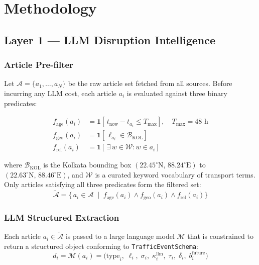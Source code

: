 \chapter{Methodology}

\section{Layer 1 --- LLM Disruption Intelligence}

\subsection{Article Pre-filter}

Let $\mathcal{A} = \{a_1, \dots, a_N\}$ be the raw article set fetched
from all sources. Before incurring any LLM cost, each article $a_i$ is
evaluated against three binary predicates:

\begin{align}
  f_{\text{age}}(a_i)  &= \mathbf{1}\!\left[\,t_{\text{now}} - t_{a_i} \leq T_{\max}\right],
  \quad T_{\max} = 48\text{ h} \label{eq:filter_age}\\
  f_{\text{geo}}(a_i)  &= \mathbf{1}\!\left[\,\ell_{a_i} \in \mathcal{B}_{\text{KOL}}\right]
  \label{eq:filter_geo}\\
  f_{\text{rel}}(a_i)  &= \mathbf{1}\!\left[\,\exists\, w \in \mathcal{W} : w \in a_i\right]
  \label{eq:filter_rel}
\end{align}

where $\mathcal{B}_{\text{KOL}}$ is the Kolkata bounding box
$(22.45^\circ\text{N},\,88.24^\circ\text{E})$ to
$(22.63^\circ\text{N},\,88.46^\circ\text{E})$,
and $\mathcal{W}$ is a curated keyword vocabulary of transport terms.
Only articles satisfying all three predicates form the filtered set:
\begin{equation}
  \tilde{\mathcal{A}} = \bigl\{\,a_i \in \mathcal{A} \;\mid\;
  f_{\text{age}}(a_i) \wedge f_{\text{geo}}(a_i) \wedge f_{\text{rel}}(a_i)\bigr\}
  \label{eq:filtered_set}
\end{equation}

\subsection{LLM Structured Extraction}

Each article $a_i \in \tilde{\mathcal{A}}$ is passed to a large language
model $\mathcal{M}$ that is constrained to return a structured object
conforming to \texttt{TrafficEventSchema}:
\begin{equation}
  d_i = \mathcal{M}(a_i) =
  \bigl(\text{type}_i,\;\ell_i,\;\sigma_i,\;\kappa_i^{\text{llm}},\;
        \tau_i,\;\delta_i,\;b_i^{\text{future}}\bigr)
  \label{eq:llm_extraction}
\end{equation}

